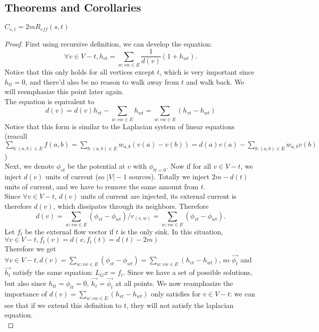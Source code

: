 \documentclass[12pt]{article}
\newenvironment{theorem}[2][Theorem]{\begin{trivlist}
\item[\hskip \labelsep {\bfseries #1}\hskip \labelsep {\bfseries #2.}]}{\end{trivlist}}
\begin{document}
\subsection{Theorems and Corollaries}
\begin{theorem}{1}
	$C_{s, t} = 2mR_{eff}(s, t)$
\end{theorem}
\begin{proof}
	First using recursive definition, we can develop the equation: $$\forall v \in V - t, h_{vt} = \sum_{w : vw \in E}\frac{1}{d(v)}(1 + h_{wt}).$$
	Notice that this only holds for all vertices except $t$, which is very important since $h_{tt} = 0$, and there'd also be no reason to walk away from $t$ and walk back. We will reemphasize this point later again.\\
	\newline
	The equation is equivalent to $$d(v) = d(v)h_{vt} - \sum_{w : vw \in E}h_{wt} = \sum _ {  w : vw \in E} \left( h _ { v t } - h _ { w t } \right)$$
	Notice that this form is similar to the Laplacian system of linear equations (reacall $\sum _ { b : ( a , b ) \in E } f ( a , b ) = \sum _ { b : ( a , b ) \in E } w _ { a , b } ( v ( a ) - v ( b ) ) = d ( a ) v ( a ) - \sum _ { b : ( a , b ) \in E } w _ { a , b } v ( b )$)\\
	\newline
	Next, we denote $\phi_{vt}$ be the potential at $v$ with $\phi_{tt = 0}$. Now if for all $v \in V - t$, we inject $d(v)$ units of current (so $|V| - 1$ sources). Totally we inject $2m - d(t)$ units of current, and we have to remove the same amount from $t$. \\
	\newline
	Since $\forall v \in V - t$, $d(v)$ units of current are injected, its external current is therefore $d(v)$, which dissipates through its neighbors. Therefore $$d(v) = \sum_{w : vw\in E}(\phi_{vt} - \phi_{wt})/r_{(v, w)} = \sum_{w : vw\in E}(\phi_{vt} - \phi_{wt}).$$ Let $f_{t}$ be the external flow vector if $t$ is the only sink. In this situation, $\forall v \in V-t, f_{t}(v) = d(v, f_{t}(t) = d(t) - 2m)$\\
	\newline
	Therefore we get $\forall v \in V-t, d(v) = \sum_{w : vw\in E}(\phi_{vt} - \phi_{wt}) = \sum _ {  w : vw \in E} \left( h _ { v t } - h _ { w t } \right)$, so $\vec{\phi_t}$ and $\vec{h_t}$ satisfy the same equation: $L_{G}x  = f_{t}$. Since we have a set of possible solutions, but also since $h_{tt} = \phi_{tt} = 0$, $\vec{h_t} = \vec{\phi_t}$ at all points. We now reamphasize the importance of $d(v) = \sum _ {  w : vw \in E} \left( h _ { v t } - h _ { w t } \right)$ only satisfies for $v \in V - t$: we can see that if we extend this definition to $t$, they will not satisfy the laplacian equation.\\

\end{proof}
\end{document}
